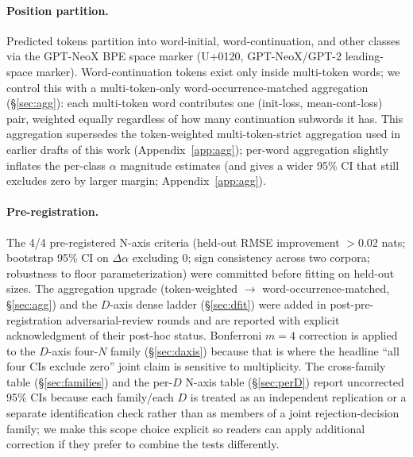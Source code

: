 \documentclass[10pt]{article}
\newcommand{\dalpha}{\Delta\alpha}
\begin{document}
\paragraph{Position partition.} Predicted tokens partition into
word-initial, word-continuation, and other classes via the GPT-NeoX
BPE space marker \texttt{} (U+0120, GPT-NeoX/GPT-2 leading-space marker). Word-continuation tokens exist only inside
multi-token words; we control this with a multi-token-only
word-occurrence-matched aggregation (\S\ref{sec:agg}): each
multi-token word contributes one (init-loss, mean-cont-loss) pair,
weighted equally regardless of how many continuation subwords it has.
This aggregation supersedes the token-weighted multi-token-strict
aggregation used in earlier drafts of this work
(Appendix~\ref{app:agg}); per-word aggregation slightly inflates the
per-class $\alpha$ magnitude estimates (and gives a wider 95\% CI
that still excludes zero by larger margin; Appendix~\ref{app:agg}).

\paragraph{Pre-registration.} The 4/4 pre-registered N-axis criteria
(held-out RMSE improvement $> 0.02$ nats; bootstrap 95\% CI on
$\dalpha$ excluding 0; sign consistency across two corpora; robustness
to floor parameterization) were committed before fitting on held-out
sizes. The aggregation upgrade (token-weighted $\to$
word-occurrence-matched, \S\ref{sec:agg}) and the $D$-axis dense
ladder (\S\ref{sec:dfit}) were added in post-pre-registration
adversarial-review rounds and are reported with explicit
acknowledgment of their post-hoc status. Bonferroni $m{=}4$
correction is applied to the $D$-axis four-$N$ family
(\S\ref{sec:daxis}) because that is where the headline ``all four
CIs exclude zero'' joint claim is sensitive to multiplicity. The
cross-family table (\S\ref{sec:families}) and the per-$D$ N-axis
table (\S\ref{sec:perD}) report uncorrected 95\% CIs because each
family/each $D$ is treated as an independent replication or a
separate identification check rather than as members of a joint
rejection-decision family; we make this scope choice explicit so
readers can apply additional correction if they prefer to combine
the tests differently.
\end{document}
